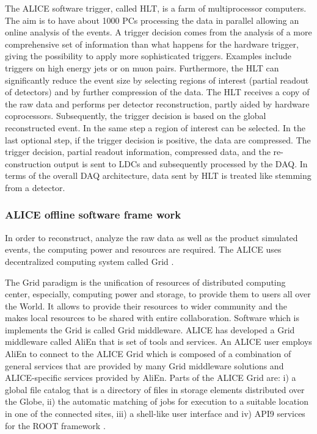 The ALICE software trigger, called HLT, is a farm of multiprocessor computers. The aim is to have about 1000 PCs processing the data in parallel allowing an online analysis of the events. A trigger decision comes from the analysis of a more comprehensive set of information than what happens for the hardware trigger, giving the possibility to apply more sophisticated triggers. Examples include triggers on high energy jets or on muon pairs. Furthermore, the HLT can significantly reduce the event size by selecting regions of interest (partial readout of detectors) and by further compression of the data. The HLT receives a copy of the raw data and performs per detector reconstruction, partly aided by hardware coprocessors. Subsequently, the trigger decision is based on the global reconstructed event. In the same step a region of interest can be selected. In the last optional step, if the trigger decision is positive, the data are compressed. The trigger decision, partial readout information, compressed data, and the re- construction output is sent to LDCs and subsequently processed by the DAQ. In terms of the overall DAQ architecture, data sent by HLT is treated like stemming from a detector.

\newpage
\subsubsection{ALICE offline software frame work}\label{label:alicesw}
In order to reconstruct, analyze the raw data as well as the product simulated events, the computing power and resources are required. The ALICE uses decentralized computing system called Grid \cite{cite:grid}.

The Grid paradigm is the unification of resources of distributed computing center, especially, computing power and storage, to provide them to users all over the World. It allows to provide their resources to wider community and the makes local resources to be shared with entire collaboration. Software which is implements the Grid is called Grid middleware. ALICE has developed a Grid middleware called AliEn \cite{cite:alien} that is set of tools and services. An ALICE user employs AliEn to connect to the ALICE Grid which is composed of a combination of general services that are provided by many Grid middleware solutions and ALICE-specific services provided by AliEn. Parts of the ALICE Grid are: i) a global file catalog that is a directory of files in storage elements distributed over the Globe, ii) the automatic matching of jobs for execution to a suitable location in one of the connected sites, iii) a shell-like user interface and iv) API9 services for the ROOT framework \cite{cite:aliroot}.


